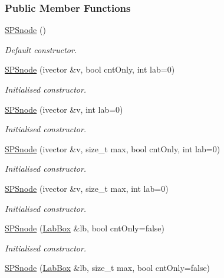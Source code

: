 \subsubsection*{\-Public \-Member \-Functions}
\begin{DoxyCompactItemize}
\item 
\hyperlink{classsubpavings_1_1SPSnode_ae8fb89ca868b4ec2b47d0273cd32f5f5}{\-S\-P\-Snode} ()
\begin{DoxyCompactList}\small\item\em \-Default constructor. \end{DoxyCompactList}\item 
\hyperlink{classsubpavings_1_1SPSnode_abcddd86c703c7263435686a5f7ad42f5}{\-S\-P\-Snode} (ivector \&v, bool cnt\-Only, int lab=0)
\begin{DoxyCompactList}\small\item\em \-Initialised constructor. \end{DoxyCompactList}\item 
\hyperlink{classsubpavings_1_1SPSnode_a51f7f0ed3dd43f8851556ea4a3cb4209}{\-S\-P\-Snode} (ivector \&v, int lab=0)
\begin{DoxyCompactList}\small\item\em \-Initialised constructor. \end{DoxyCompactList}\item 
\hyperlink{classsubpavings_1_1SPSnode_a775af2d808a8a9a59f29e6c25b6f0e4f}{\-S\-P\-Snode} (ivector \&v, size\-\_\-t max, bool cnt\-Only, int lab=0)
\begin{DoxyCompactList}\small\item\em \-Initialised constructor. \end{DoxyCompactList}\item 
\hyperlink{classsubpavings_1_1SPSnode_ad8f8a441fe2406ef50dc3d1fb06cb5b9}{\-S\-P\-Snode} (ivector \&v, size\-\_\-t max, int lab=0)
\begin{DoxyCompactList}\small\item\em \-Initialised constructor. \end{DoxyCompactList}\item 
\hyperlink{classsubpavings_1_1SPSnode_af4aa97973f8fac14503ec22574675a99}{\-S\-P\-Snode} (\hyperlink{classLabBox}{\-Lab\-Box} \&lb, bool cnt\-Only=false)
\begin{DoxyCompactList}\small\item\em \-Initialised constructor. \end{DoxyCompactList}\item 
\hyperlink{classsubpavings_1_1SPSnode_a86d9a45e0f5a59b94d556279dafd92f9}{\-S\-P\-Snode} (\hyperlink{classLabBox}{\-Lab\-Box} \&lb, size\-\_\-t max, bool cnt\-Only=false)

\end{DoxyCompactItemize}
